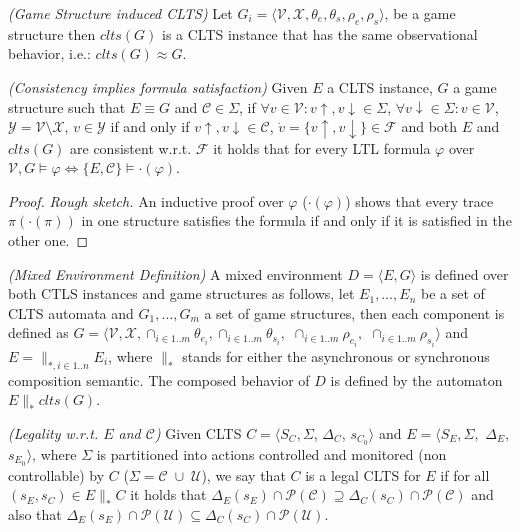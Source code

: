 \begin{definition}
	\label{def:gs_conversion} \emph{(Game Structure induced CLTS)} 
	Let $G_i=\langle \mathcal{V}, \mathcal{X}, \theta_{e}, \theta_{s}, \rho_{e}, \rho_{s}\rangle$, be a game structure then $clts(G)$ is a CLTS instance that has the same observational behavior, i.e.: $clts(G) \approx G$. 
\end{definition}

\begin{lemma}
	\label{def:gs_clts_equiv_implies_satifaction} \emph{(Consistency implies formula satisfaction)} 
	Given $E$ a CLTS instance, $G$ a game structure such that $E \equiv G$ and $\mathcal{C} \in \Sigma$, if $\forall v \in \mathcal{V}: v\uparrow, v\downarrow \in \Sigma$, $\forall v\downarrow \in \Sigma : v \in \mathcal{V}$,
$\mathcal{Y} = \mathcal{V}\setminus \mathcal{X}$, $v \in \mathcal{Y}$ if and only if $v\uparrow, v\downarrow \in \mathcal{C}$, $\dot{v} = \lbrace v\uparrow, v\downarrow \rbrace \in \mathcal{F}$ and both $E$ and $clts(G)$ are consistent w.r.t. $\mathcal{F}$ it holds that for every LTL formula $\varphi$ over $\mathcal{V}, G \models \varphi \iff \lbrace E, \mathcal{C} \rbrace \models \cdot(\varphi)$.
\end{lemma}

\begin{proof}
\emph{Rough sketch.} An inductive proof over $\varphi$ ($\cdot(\varphi)$) shows that every trace $\pi (\cdot(\pi))$ in one structure satisfies the formula if and only if it is satisfied in the other one. 
\end{proof}

\begin{definition}
	\label{def:mixed_env} \emph{(Mixed Environment Definition)} 
	A mixed environment $D = \langle E, G \rangle$ is defined over both CTLS instances and game structures as follows,
	let $E_1,\ldots,E_n$ be a set of CLTS automata and $G_1,\ldots,G_m$ a set of game structures,
	then each component is defined as $G=\langle \mathcal{V}, \mathcal{X}, \cap_{i \in 1..m}\theta_{e_i}, \cap_{i \in 1..m}\theta_{s_i},$ $\cap_{i \in 1..m}\rho_{e_i},$ $\cap_{i \in 1..m}\rho_{s_i}\rangle$ and $E = \parallel_{*,i \in 1..n} E_i$, where $\parallel_*$ stands for either the asynchronous or synchronous composition semantic.
	The composed behavior of $D$ is defined by the automaton $E \parallel_* clts(G)$.
\end{definition}

\begin{definition}
	\label{def:legal_clts} \emph{(Legality w.r.t. $E$ and $\mathcal{C}$)} 
	Given CLTS $C = \langle S_C, \Sigma$, $\Delta_C$, $s_{C_0}\rangle$ and $E = \langle S_E,\Sigma,$ $\Delta_E,$ $s_{E_0}\rangle$, where $\Sigma$ is partitioned into actions controlled and monitored (non controllable) by $C$ ($\Sigma=\mathcal{C} \; \cup \;\mathcal{U}$), we say that $C$ is a legal CLTS for $E$ if for all $(s_E,s_C) \in E \parallel_* C$ it holds that
	$\Delta_{E}(s_E)\cap \mathcal{P}(\mathcal{C}) \supseteq \Delta_{C}(s_C)\cap \mathcal{P}(\mathcal{C})$ and also that  $\Delta_{E}(s_E)\cap \mathcal{P}(\mathcal{U}) \subseteq \Delta_{C}(s_C)\cap \mathcal{P}(\mathcal{U})$.
\end{definition}


